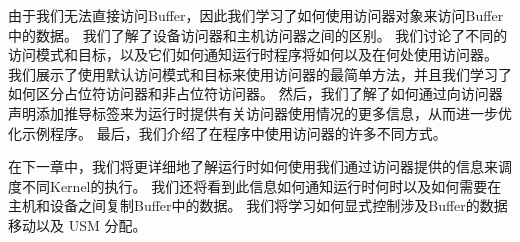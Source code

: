 由于我们无法直接访问Buffer，因此我们学习了如何使用访问器对象来访问Buffer中的数据。 
我们了解了设备访问器和主机访问器之间的区别。 
我们讨论了不同的访问模式和目标，以及它们如何通知运行时程序将如何以及在何处使用访问器。 
我们展示了使用默认访问模式和目标来使用访问器的最简单方法，并且我们学习了如何区分占位符访问器和非占位符访问器。 
然后，我们了解了如何通过向访问器声明添加推导标签来为运行时提供有关访问器使用情况的更多信息，从而进一步优化示例程序。 
最后，我们介绍了在程序中使用访问器的许多不同方式。

在下一章中，我们将更详细地了解运行时如何使用我们通过访问器提供的信息来调度不同Kernel的执行。 
我们还将看到此信息如何通知运行时何时以及如何需要在主机和设备之间复制Buffer中的数据。 
我们将学习如何显式控制涉及Buffer的数据移动以及 USM 分配。